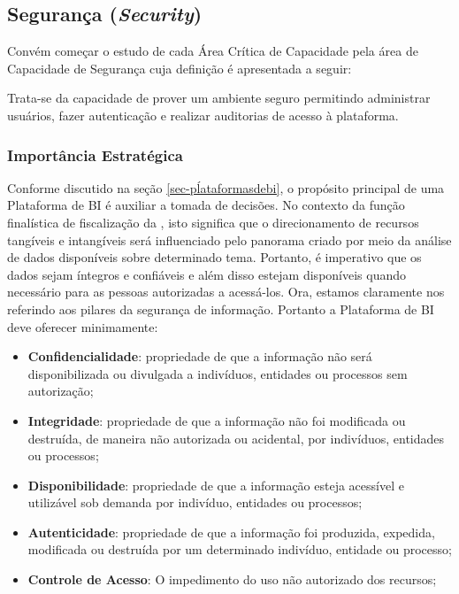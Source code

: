 \subsection{Segurança (\emph{Security}) }
\label{sub-security}

Convém começar o estudo de cada Área Crítica de Capacidade pela área de Capacidade de Segurança cuja definição é apresentada a seguir: 

\begin{definition}
Trata-se da capacidade de prover um ambiente seguro permitindo administrar usuários, fazer autenticação e realizar auditorias de acesso à plataforma.
\end{definition}

\subsubsection*{Importância Estratégica}

Conforme discutido na seção \ref{sec-pĺataformasdebi}, o propósito principal de uma Plataforma de BI é auxiliar a tomada de decisões. No contexto da função finalística de fiscalização da \CLDF, isto significa que o direcionamento de recursos tangíveis e intangíveis será influenciado pelo panorama criado por meio da análise de dados disponíveis sobre determinado tema. Portanto, é imperativo que os dados sejam íntegros e confiáveis e além disso estejam disponíveis quando necessário para as pessoas autorizadas a acessá-los. Ora, estamos claramente nos referindo aos pilares da segurança de informação. Portanto a Plataforma de BI deve oferecer minimamente:


\begin{itemize}
    \item \textbf{Confidencialidade}: propriedade de que a informação não será disponibilizada ou divulgada a indivíduos, entidades ou processos sem autorização; 
    \item \textbf{Integridade}: propriedade de que a informação não foi modificada ou destruída, de maneira não autorizada ou acidental, por indivíduos, entidades ou processos;
    \item \textbf{Disponibilidade}: propriedade de que a informação esteja acessível e utilizável sob demanda por indivíduo, entidades ou processos;
    \item \textbf{Autenticidade}: propriedade de que a informação foi produzida, expedida, modificada ou destruída por um determinado indivíduo, entidade ou processo;
    \item \textbf{Controle de Acesso}: O impedimento do uso não autorizado dos recursos;
\end{itemize}

